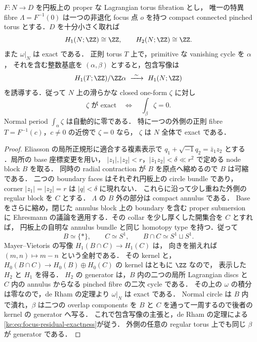 \begin{lemma}
\label{ke:focus-neighborhood-period}
$F:N\to D$ を円板上の proper な Lagrangian torus fibration とし，
唯一の特異 fibre $\Lambda=F^{-1}(0)$ は一つの非退化 focus 点 $o$ を持つ
compact connected pinched torus とする．$D$ を十分小さく取れば
\[
 H_1(N;\ZZ)\cong\ZZ,\qquad H_2(N;\ZZ)\cong\ZZ.
\]
また $\omega|_N$ は exact である．
正則 torus $T$ 上で，primitive な vanishing cycle を $\alpha$，
それを含む整数基底を $(\alpha,\beta)$ とすると，包含写像は
\[
 H_1(T;\ZZ)/\ZZ\alpha\ \xrightarrow{\ \sim\ }\ H_1(N;\ZZ)
\]
を誘導する．従って $N$ 上の滑らかな closed one-form $\zeta$ に対し
\begin{equation}\label{ke:eq:focus-residual-exactness}
 \zeta\text{ が exact}\quad\Longleftrightarrow\quad
 \int_\beta\zeta=0.
\end{equation}
Normal period $\int_\alpha\zeta$ は自動的に零である．
特に一つの外側の正則 fibre $T=F^{-1}(c)$，$c\ne0$ の近傍で $\zeta=0$ なら，
$\zeta$ は $N$ 全体で exact である．
\end{lemma}
\begin{proof}
Eliasson の局所正規形に適合する複素表示で
$q_1+\sqrt{-1}q_2=\bar z_1z_2$ とする
\cite[\S2]{ZungFocus}．局所の base 座標変更を用い，
$|z_1|,|z_2|<r$，$|\bar z_1z_2|<\delta\ll r^2$ で定める node block $B$ を取る．
同時の radial contraction が $B$ を原点へ縮めるので $B$ は可縮である．
二つの boundary faces はそれぞれ円板上の circle bundle であり，
corner $|z_1|=|z_2|=r$ は $|q|<\delta$ に現れない．
これらに沿って少し重ねた外側の regular block を $C$ とする．
$\Lambda$ の $B$ 外の部分は compact annulus である．
Base をさらに縮め，閉じた annulus block 上の boundary を含む proper submersion に
Ehresmann の議論を適用する．その collar を少し厚くした開集合を $C$ とすれば，
円板上の自明な annulus bundle と同じ homotopy type を持つ．従って
\[
 B\simeq\{*\},\qquad C\simeq S^1,
 \qquad B\cap C\simeq S^1\sqcup S^1.
\]
Mayer--Vietoris の写像 $H_1(B\cap C)\to H_1(C)$ は，
向きを揃えれば $(m,n)\mapsto m-n$ という全射である．
その kernel と，$H_0(B\cap C)\to H_0(B)\oplus H_0(C)$ の kernel はともに $\ZZ$ なので，
表示した $H_2$ と $H_1$ を得る．
$H_2$ の generator は，$B$ 内の二つの局所 Lagrangian discs と
$C$ 内の annulus からなる pinched fibre の二次 cycle である．
その上の $\omega$ の積分は零なので，de Rham の定理より $\omega|_N$ は exact である．
Normal circle は $B$ 内で潰れ，$\beta$ は二つの overlap components を
$B$ と $C$ を通って一周するので後者の kernel の generator へ写る．
これで包含写像の主張と，de Rham の定理による\eqref{ke:eq:focus-residual-exactness}が従う．
外側の任意の regular torus 上でも同じ $\beta$ が generator である．
\end{proof}

